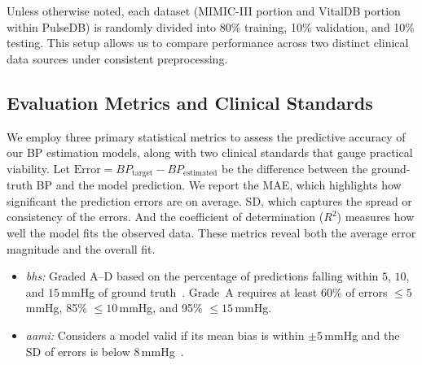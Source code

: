 Unless otherwise noted, each dataset (MIMIC-III portion and VitalDB portion within PulseDB) is randomly divided into 80\% training, 10\% validation, and 10\% testing. This setup allows us to compare performance across two distinct clinical data sources under consistent preprocessing.

\subsection{Evaluation Metrics and Clinical Standards}\label{subsec:metrics}

We employ three primary statistical metrics to assess the predictive accuracy of our BP estimation models, along with two clinical standards that gauge practical viability. Let $\text{Error} = BP_{\text{target}} - BP_{\text{estimated}}$ be the difference between the ground-truth BP and the model prediction. We report the MAE, which highlights how significant the prediction errors are on average. SD, which captures the spread or consistency of the errors. And the coefficient of determination ($R^2$) measures how well the model fits the observed data. These metrics reveal both the average error magnitude and the overall fit.

\begin{itemize}
    \item \textit{\gls{bhs}:} Graded A--D based on the percentage of predictions falling within $5$, $10$, and $15$\,mmHg of ground truth~\cite{BHS}. Grade~A requires at least 60\% of errors $\le5$\,mmHg, 85\% $\le10$\,mmHg, and 95\% $\le15$\,mmHg.
    \item \textit{\gls{aami}:} Considers a model valid if its mean bias is within $\pm5$\,mmHg and the SD of errors is below 8\,mmHg~\cite{AAMI}.
\end{itemize}

